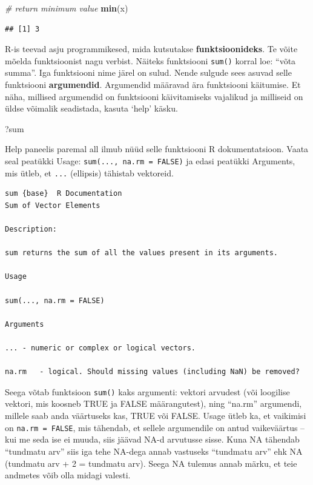 \documentclass[]{book}
\newenvironment{Shaded}{\begin{snugshade}}{\end{snugshade}}
\newcommand{\KeywordTok}[1]{\textcolor[rgb]{0.13,0.29,0.53}{\textbf{#1}}}
\newcommand{\CommentTok}[1]{\textcolor[rgb]{0.56,0.35,0.01}{\textit{#1}}}
\newcommand{\NormalTok}[1]{#1}
\begin{document}
\begin{Shaded}
\begin{Highlighting}[]
\CommentTok{# return minimum value}
\KeywordTok{min}\NormalTok{(x)}
\end{Highlighting}
\end{Shaded}

\begin{verbatim}
## [1] 3
\end{verbatim}

R-is teevad asju programmikesed, mida kutsutakse
\textbf{funktsioonideks}. Te võite mõelda funktsioonist nagu verbist.
Näiteks funktsiooni \texttt{sum()} korral loe: ``võta summa''. Iga
funktsiooni nime järel on sulud. Nende sulgude sees asuvad selle
funktsiooni \textbf{argumendid}. Argumendid määravad ära funktsiooni
käitumise. Et näha, millised argumendid on funktsiooni käivitamiseks
vajalikud ja milliseid on üldse võimalik seadistada, kasuta `help'
käsku.

\begin{Shaded}
\begin{Highlighting}[]
\NormalTok{?sum}
\end{Highlighting}
\end{Shaded}

Help paneelis paremal all ilmub nüüd selle funktsiooni R
dokumentatsioon. Vaata seal peatükki Usage:
\texttt{sum(...,\ na.rm\ =\ FALSE)} ja edasi peatükki Arguments, mis
ütleb, et \texttt{...} (ellipsis) tähistab vektoreid.

\begin{verbatim}
sum {base}  R Documentation 
Sum of Vector Elements

Description:

sum returns the sum of all the values present in its arguments.

Usage

sum(..., na.rm = FALSE)

Arguments

... - numeric or complex or logical vectors.

na.rm   - logical. Should missing values (including NaN) be removed?
\end{verbatim}

Seega võtab funktsioon \texttt{sum()} kaks argumenti: vektori arvudest
(või loogilise vektori, mis koosneb TRUE ja FALSE määrangutest), ning
``na.rm'' argumendi, millele saab anda väärtuseks kas, TRUE või FALSE.
Usage ütleb ka, et vaikimisi on \texttt{na.rm\ =\ FALSE}, mis tähendab,
et sellele argumendile on antud vaikeväärtus -- kui me seda ise ei
muuda, siis jäävad NA-d arvutusse sisse. Kuna NA tähendab ``tundmatu
arv'' siis iga tehe NA-dega annab vastuseks ``tundmatu arv'' ehk NA
(tundmatu arv + 2 = tundmatu arv). Seega NA tulemus annab märku, et teie
andmetes võib olla midagi valesti.
\end{document}
